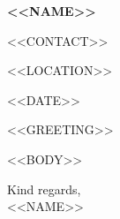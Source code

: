 \documentclass[11pt,a4paper]{article}
\begin{document}
{\LARGE\bfseries <<NAME>>}\par
\vspace{5pt}
{\small <<CONTACT>>}\par
{\small <<LOCATION>>}

\vspace{1.6em}
\noindent <<DATE>>

\vspace{1em}
\noindent <<GREETING>>

\vspace{0.6em}
<<BODY>>

\vspace{1.2em}
\noindent Kind regards,\\[1.2em]
<<NAME>>
\end{document}
